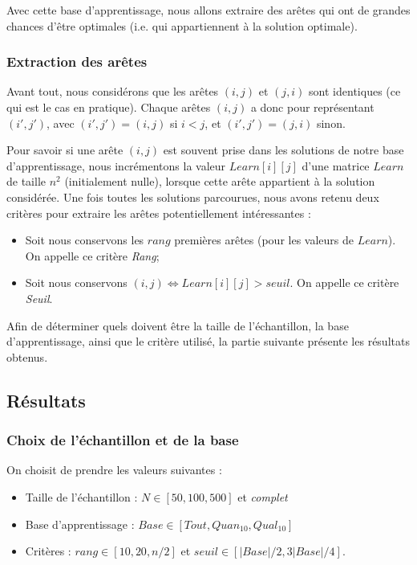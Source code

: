 \documentclass[a4paper,11pt]{article}%
\begin{document}
Avec cette base d'apprentissage, nous allons extraire des arêtes qui ont de grandes chances d'être optimales (i.e. qui appartiennent à la solution optimale).

\subsubsection{Extraction des arêtes}
Avant tout, nous considérons que les arêtes $(i,j)$ et $(j,i)$ sont identiques (ce qui est le cas en pratique). Chaque arêtes $(i,j)$ a donc pour représentant $(i',j')$, avec $(i',j') = (i,j)$ si $i<j$, et $(i',j') = (j,i)$ sinon.

Pour savoir si une arête $(i,j)$ est souvent prise dans les solutions de notre base d'apprentissage, nous incrémentons la valeur $Learn[i][j]$ d'une matrice $Learn$ de taille $n^2$ (initialement nulle), lorsque cette arête appartient à la solution considérée.
Une fois toutes les solutions parcourues, nous avons retenu deux critères pour extraire les arêtes potentiellement intéressantes :

\begin{itemize}
\item Soit nous conservons les $rang$ premières arêtes (pour les valeurs de $Learn$). On appelle ce critère \emph{Rang};
\item Soit nous conservons $(i,j) \Leftrightarrow Learn[i][j] > seuil$. On appelle ce critère \emph{Seuil}.
\end{itemize}

Afin de déterminer quels doivent être la taille de l'échantillon, la base d'apprentissage, ainsi que le critère utilisé, la partie suivante présente les résultats obtenus.

\subsection{Résultats}


\subsubsection{Choix de l'échantillon et de la base}

On choisit de prendre les valeurs suivantes :

\begin{itemize}
\item Taille de l'échantillon : $N \in [50,100,500]$ et \emph{complet}
\item Base d'apprentissage : $Base \in [Tout, Quan_{10}, Qual_{10}]$
\item Critères : $rang \in [10,20,n/2]$ et $seuil \in [\vert Base \vert /2, 3\vert Base \vert /4]$.
\end{itemize}
\end{document}
